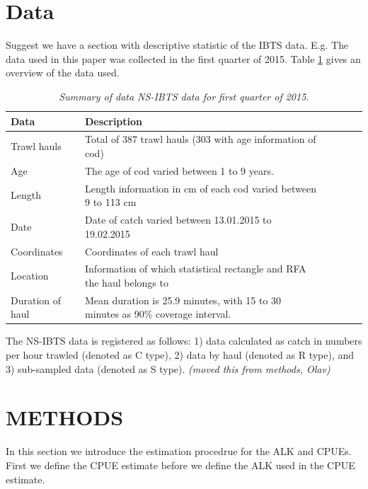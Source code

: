 \documentclass[a4paper 12pt]{article}
\numberwithin{equation}{section}
\begin{document}
\section{Data}
\label{sec:data}
Suggest we have a section with descriptive statistic of the IBTS data. E.g. The data used in this paper was collected in the first quarter of 2015. Table \ref{tab:data2015} gives an overview of the data used.

\begin{small}
\begin{table}[t!]
\begin{tabular}{llllll}
\toprule
\bf Data&\bf Description \\
\midrule
Trawl hauls  & Total of 387 trawl hauls (303 with age information of cod)  \\
Age &The age of cod varied between 1 to 9 years. \\
Length & Length information in cm of each cod varied between 9 to 113 cm\\
Date&Date of catch varied between 13.01.2015 to 19.02.2015 \\
Coordinates & Coordinates of each trawl haul\\
Location & Information of which statistical rectangle and RFA the haul belongs to\\
Duration of haul & Mean duration is 25.9 minutes, with 15  to 30 minutes as 90\% coverage interval. \\
\bottomrule
\end{tabular}
\caption{\textit{Summary of data NS-IBTS data for first quarter of 2015.}}
\label{tab:data2015}
\end{table}
\end{small}


The NS-IBTS data is registered as follows: 1) data calculated as catch in  numbers per hour trawled (denoted as C type), 2) data by haul (denoted as R type), and 3) sub-sampled data (denoted as S type). \textit{(moved this from methods, Olav)}


\section{\large METHODS}
\label{sec:methods}
In this section we introduce the estimation procedrue for the ALK and CPUEs. First we define the CPUE estimate before we define the ALK used in the CPUE estimate.
\end{document}
